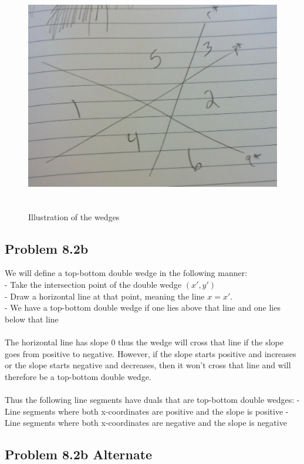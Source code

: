 \documentclass[11pt,psfig]{article}
\begin{document}
\begin{figure}[H]
\centering
\includegraphics[height=4in]{cs266dual.jpg}
\caption{Illustration of the wedges}
\end{figure}

\subsection*{Problem 8.2b}

We will define a top-bottom double wedge in the following manner:
\\
- Take the intersection point of the double wedge $(x',y')$
\\
- Draw a horizontal line at that point, meaning the line $x=x'$. 
\\
- We have a top-bottom double wedge if one lies above that line and one lies below that line
\\
\\
The horizontal line has slope $0$ thus the wedge will cross that line if the slope goes from positive to negative. However, if the slope starts positive and increases or the slope starts negative and decreases, then it won't cross that line and will therefore be a top-bottom double wedge. 
\\
\\
Thus the following line segments have duals that are top-bottom double wedges:
- Line segments where both x-coordinates are positive and the slope is positive
- Line segments where both x-coordinates are negative and the slope is negative

\subsection*{Problem 8.2b Alternate}
\end{document}
